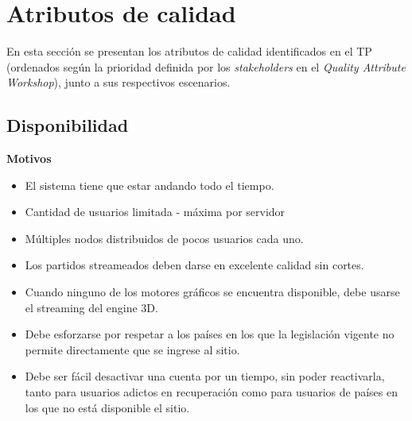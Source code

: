 \section{Atributos de calidad}

En esta sección se presentan los atributos de calidad identificados en el TP (ordenados según la prioridad definida por los \emph{stakeholders} en el \emph{Quality Attribute Workshop}), junto a sus respectivos escenarios.

\subsection{Disponibilidad}

\textbf{Motivos}
\begin{itemize}

\item El sistema tiene que estar andando todo el tiempo.
\item Cantidad de usuarios limitada - máxima por servidor
\item Múltiples nodos distribuidos de pocos usuarios cada uno.
\item Los partidos streameados deben darse en excelente calidad sin cortes.
\item Cuando ninguno de los motores gráficos se encuentra disponible, debe usarse el streaming del engine 3D.
\item Debe esforzarse por respetar a los países en los que la legislación vigente no permite directamente que se ingrese al sitio.
\item Debe ser fácil desactivar una cuenta por un tiempo, sin poder reactivarla, tanto para usuarios adictos en recuperación como para usuarios de países en los que no está disponible el sitio.
\end{itemize}


